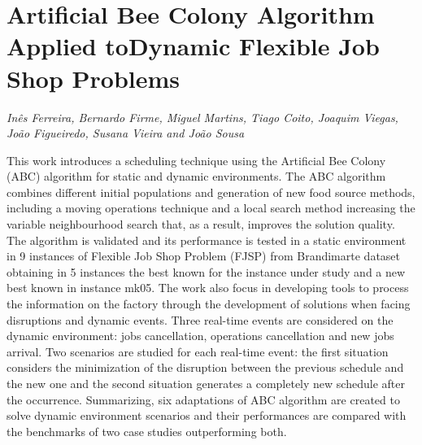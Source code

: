 \documentclass[../booklet.tex]{subfiles}
\begin{document}
\section[Artificial Bee Colony Algorithm Applied toDynamic Flexible Job Shop Problems. {\it Inês Ferreira, Bernardo Firme, Miguel Martins, Tiago Coito, Joaquim Viegas, João Figueiredo, Susana Vieira and João Sousa}]{Artificial Bee Colony Algorithm Applied toDynamic Flexible Job Shop Problems}
       

\begin{center}
  {\it Inês Ferreira, Bernardo Firme, Miguel Martins, Tiago Coito, Joaquim Viegas, João Figueiredo, Susana Vieira and João Sousa}
\end{center}

\vskip 0.8cm


This work introduces a scheduling technique using the Artificial Bee Colony (ABC) algorithm for static and dynamic environments.
The ABC algorithm combines different initial populations and generation of new food source methods, including a moving operations technique and a local search method increasing the variable neighbourhood search that, as a result, improves the solution quality. The algorithm is validated and its performance is tested in a static environment in 9 instances of Flexible Job Shop Problem (FJSP) from Brandimarte dataset obtaining in 5 instances the best known for the instance under study and a new best known in instance mk05.  
The work also focus in developing tools to process the information on the factory through the development of solutions when facing disruptions and dynamic events. Three real-time events are considered on the dynamic environment: jobs cancellation, operations cancellation and new jobs arrival. Two scenarios are studied for each real-time event: the first situation considers the minimization of the disruption between the previous schedule and the new one and the second situation generates a completely new schedule after the occurrence. Summarizing, six adaptations of ABC algorithm are created to solve dynamic environment scenarios and their performances are compared with the benchmarks of two case studies outperforming both. 

\end{document}
